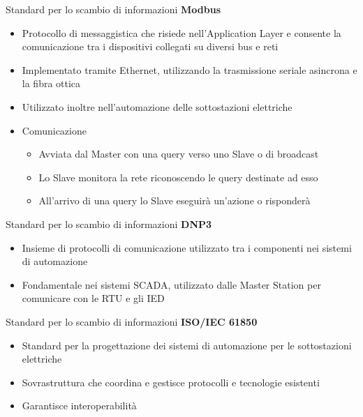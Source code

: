 \begin{frame}{Standard per lo scambio di informazioni}
	\textbf{Modbus}
	\begin{itemize}[<+- | alert@+>]
		\item Protocollo di messaggistica che risiede nell'Application Layer e consente la comunicazione tra i dispositivi collegati su diversi bus e reti
		\item Implementato tramite Ethernet, utilizzando la trasmissione seriale asincrona e la fibra ottica
		\item Utilizzato inoltre nell'automazione delle sottostazioni elettriche
		\item Comunicazione
			\begin{itemize}[<+- | alert@+>]
			\item Avviata dal Master con una query verso uno Slave o di broadcast
			\item Lo Slave monitora la rete riconoscendo le query destinate ad esso
			\item All'arrivo di una query lo Slave eseguirà un'azione o risponderà
			\end{itemize}
	\end{itemize}
\end{frame}

\begin{frame}{Standard per lo scambio di informazioni}
\textbf{DNP3}
	\begin{itemize}[<+- | alert@+>]
		\item Insieme di protocolli di comunicazione utilizzato tra i componenti nei sistemi di automazione
		\item Fondamentale nei sistemi SCADA, utilizzato dalle Master Station per comunicare con le RTU e gli IED
	\end{itemize}
\end{frame}

\begin{frame}{Standard per lo scambio di informazioni}
	\textbf{ISO/IEC 61850}
	\begin{itemize}[<+- | alert@+>]
		\item Standard per la progettazione dei sistemi di automazione per le sottostazioni elettriche
		\item Sovrastruttura che coordina e gestisce protocolli e tecnologie esistenti
		\item Garantisce interoperabilità
	\end{itemize}
\end{frame}

